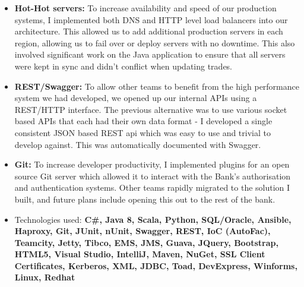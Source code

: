 \documentclass[11pt,a4paper, roman]{moderncv} %
\begin{document}
{\begin{itemize}
\item \textbf{Hot-Hot servers:} To increase availability and speed of our production systems, I implemented both DNS and HTTP level load balancers into our architecture. This allowed us to add additional production servers in each region, allowing us to fail over or deploy servers with no downtime. This also involved significant work on the Java application to ensure that all servers were kept in sync and didn't conflict when updating trades.
\item \textbf{REST/Swagger:} To allow other teams to benefit from the high performance system we had developed, we opened up our internal APIs using a REST/HTTP interface. The previous alternative was to use various socket based APIs that each had their own data format - I developed a single consistent JSON based REST api which was easy to use and trivial to develop against. This was automatically documented with Swagger.
\item \textbf{Git:} To increase developer productivity, I implemented plugins for an open source Git server which allowed it to interact with the Bank's authorisation and authentication systems. Other teams rapidly migrated to the solution I built, and future plans include opening this out to the rest of the bank.
\item {Technologies used:} \textbf{C\#, Java 8, Scala, Python, SQL/Oracle, Ansible, Haproxy, Git, JUnit, nUnit, Swagger, REST, IoC (AutoFac), Teamcity, Jetty, Tibco, EMS, JMS, Guava, JQuery, Bootstrap, HTML5, Visual Studio, IntelliJ, Maven, NuGet, SSL Client Certificates, Kerberos, XML, JDBC, Toad, DevExpress, Winforms, Linux, Redhat}
\end{itemize}
}
\nopagebreak
\end{document}
